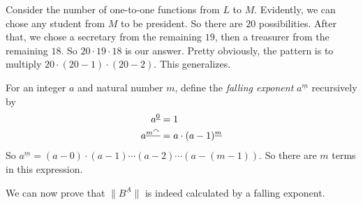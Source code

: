 Consider the number of one-to-one functions from $L$ to $M$. Evidently, we can chose any student from $M$ to be president. So there are $20$ possibilities. After that, we chose a secretary from the remaining $19$, then a treasurer from the remaining $18$. So $20\cdot 19\cdot 18$ is our answer. Pretty obviously, the pattern is to multiply $20\cdot(20-1)\cdot(20-2)$. This generalizes.

\begin{defn}
	For an integer $a$ and natural number $m$, define the \emph{falling exponent} $a^{\underline m}$ recursively by
	\begin{align*}
	a^{\underline 0} &= 1\\
	a^{\underline{m^\curvearrowright}} &= a\cdot (a-1)^{\underline m}	
	\end{align*}
	So $a^{\underline m} = (a-0)\cdot(a-1)\cdots(a-2)\cdots(a-(m-1))$. So there are $m$ terms in this expression.
\end{defn}

We can now prove that $\lVert B^{\underline A}\rVert$ is indeed calculated by a falling exponent.

\vfil
\printbreak

